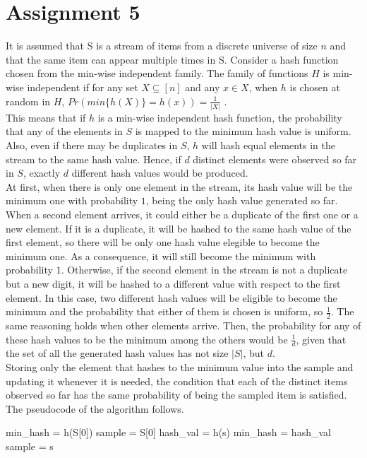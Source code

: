 \documentclass[]{report}
\begin{document}
\section*{Assignment 5}
It is assumed that S is a stream of items from a discrete universe of size $n$ and that the same item can appear multiple times in S.
Consider a hash function chosen from the min-wise independent family. The family of functions $H$ is min-wise independent if for any set $X \subseteq [n]$ and any $x \in X$, when $h$ is chosen at random in $H$, $Pr(min\{h(X)\} = h(x)) = \frac{1}{|X|}$ \cite{mw}. \\ This means that if $h$ is a min-wise independent hash function, the probability that any of the elements in $S$ is mapped to the minimum hash value is uniform. Also, even if there may be duplicates in $S$, $h$ will hash equal elements in the stream to the same hash value. Hence, if $d$ distinct elements were observed so far in $S$, exactly $d$ different hash values would be produced.\\ At first, when there is only one element in the stream, its hash value will be the minimum one with probability $1$, being the only hash value generated so far. When a second element arrives, it could either be a duplicate of the first one or a new element. If it is a duplicate, it will be hashed to the same hash value of the first element, so there will be only one hash value elegible to become the minimum one. As a consequence, it will still become the minimum with probability $1$. Otherwise, if the second element in the stream is not a duplicate but a new digit, it will be hashed to a different value with respect to the first element. In this case, two different hash values will be eligible to become the minimum and the probability that either of them is chosen is uniform, so $\frac{1}{2}$. The same reasoning holds when other elements arrive.
Then, the probability for any of these hash values to be the minimum among the others would be $\frac{1}{d}$, given that the set of all the generated hash values has not size $|S|$, but $d$. \\
Storing only the element that hashes to the minimum value into the sample and updating it whenever it is needed, the condition that each of the distinct items observed so far has the same probability of being the sampled item is satisfied. The pseudocode of the algorithm follows.\\
\begin{algorithmic}
\State min\_hash = h(S[0]) 
\State sample = S[0] 
\State hash\_val = h(s)
\State min\_hash = hash\_val 
\State sample = s
\EndIf \EndFor \\
\end{algorithmic}
\end{document}
